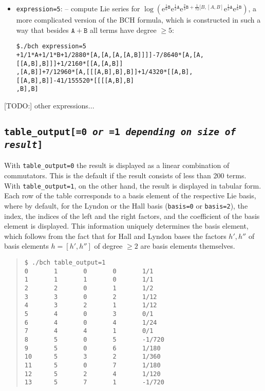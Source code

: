 \documentclass[11pt,a4paper]{article}
\newcommand{\ee}{\mathrm{e}}
\renewcommand{\AA}{\mathtt{A}}
\newcommand{\BB}{\mathtt{B}}
\begin{document}
\begin{itemize}[leftmargin=*]
\item {\tt expression=5}: -- compute Lie series for $\log(\ee^{\frac{1}{6}\BB}\ee^{\frac{1}{2}\AA}
\ee^{\frac{2}{3}\BB+\frac{1}{72}[B,[A,B]}\ee^{\frac{1}{2}\AA}\ee^{\frac{1}{6}\BB})$,
a more complicated version of the BCH formula, which is constructed in such a way that 
besides $\AA+\BB$ all terms have degree $\geq 5$:

{\small\begin{BVerbatim}
$./bch expression=5
+1/1*A+1/1*B+1/2880*[A,[A,[A,[A,B]]]]-7/8640*[A,[A,[[A,B],B]]]+1/2160*[[A,[A,B]]
,[A,B]]+7/12960*[A,[[[A,B],B],B]]+1/4320*[[A,B],[[A,B],B]]-41/155520*[[[[A,B],B]
,B],B]
\end{BVerbatim}
}
\end{itemize}
[TODO:] other expressions...

\subsection*{\tt table\_output[=0 {\em or} =1 {\em depending on size of result}]}
With \verb|table_output=0| the result is displayed as a linear combination of commutators. 
This is the default if the result consists of less than 200 terms.
With
\verb|table_output=1|, on the other hand, the result is displayed in tabular form.
Each row of the table corresponds to a basis element of the respective Lie basis,
where by default, for the Lyndon or the Hall
basis (\verb|basis=0| or \verb|basis=2|),
the index, the indices of the left and
the right factors, and the coefficient of the basis element is displayed. 
This information uniquely determines the basis element, which follows from the
fact that 
for Hall and Lyndon bases the factors $h', h''$ of basis elements $h=[h',h'']$ of degree $\geq 2$ are
basis elements themselves.
\begin{quote} %
{\small\begin{BVerbatim}
$ ./bch table_output=1
0       1       0       0       1/1
1       1       1       0       1/1
2       2       0       1       1/2
3       3       0       2       1/12
4       3       2       1       1/12
5       4       0       3       0/1
6       4       0       4       1/24
7       4       4       1       0/1
8       5       0       5       -1/720
9       5       0       6       1/180
10      5       3       2       1/360
11      5       0       7       1/180
12      5       2       4       1/120
13      5       7       1       -1/720
\end{BVerbatim}
}\end{quote}
\end{document}
